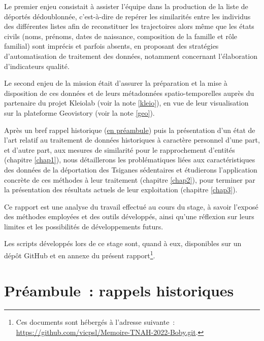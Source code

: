 \documentclass[a4paper,12pt,twoside]{book}
\begin{document}
			Le premier enjeu consistait à assister l'équipe dans la production de la liste de déportés dédoublonnée, c’est-à-dire de repérer les similarités entre les individus des différentes listes afin de reconstituer les trajectoires alors même que les états civils (noms, prénoms, dates de naissance, composition de la famille et rôle familial) sont imprécis et parfois absents, en proposant des stratégies d’automatisation de traitement des données, notamment concernant l'élaboration d'indicateurs qualité.
            
            Le second enjeu de la mission était d'assurer la préparation et la mise à disposition de ces données et de leurs métadonnées spatio-temporelles auprès du partenaire du projet Kleiolab (voir la note \ref{kleio}), en vue de leur visualisation sur la plateforme Geovistory (voir la note \ref{geo}).
            
            \pagebreak
			
			Après un bref rappel historique (\hyperref[rappels]{en préambule}) puis la présentation d'un état de l'art relatif au traitement de données historiques à caractère personnel d'une part, et d'autre part, aux mesures de similarité pour le rapprochement d'entités (chapitre \ref{chap1}), nous détaillerons les problématiques liées aux caractéristiques des données de la déportation des Tsiganes \og{}sédentaires\fg{} et étudierons l'application concrète de ces méthodes à leur traitement (chapitre \ref{chap2}), pour terminer par la présentation des résultats actuels de leur exploitation (chapitre \ref{chap3}).
			
			Ce rapport est une analyse du travail effectué au cours du stage, à savoir l'exposé des méthodes employées et des outils développés, ainsi qu'une réflexion sur leurs limites et les possibilités de développements futurs.
			
			Les scripts développés lors de ce stage sont, quand à eux, disponibles sur un dépôt GitHub et en annexe du présent rapport\footnote{%
				Ces documents sont hébergés à l'adresse suivante~: \url{https://github.com/vicpsl/Memoire-TNAH-2022-Boby.git}.}.
			

	    \newpage
    
    \makeatletter
    \let\savedchap\@makeschapterhead
    \def\@makeschapterhead{\vspace*{-3cm}\savedchap}
	
	\chapter*{Préambule~: rappels historiques}
    \label{rappels}
	
\end{document}

